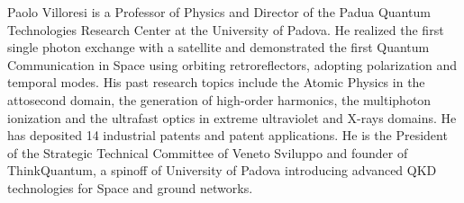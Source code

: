 \documentclass[a4paper,parskip,10pt]{scrartcl}
\begin{document}
\begin{tcolorbox}
        {
            \small
            \color{white!20!black}
            Paolo Villoresi is a Professor of Physics and Director of the Padua Quantum Technologies Research Center at the University of Padova. He realized the first single photon exchange with a satellite and demonstrated the first Quantum Communication in Space using orbiting retroreflectors, adopting polarization and temporal modes. His past research topics include the Atomic Physics in the attosecond domain, the generation of high-order harmonics, the multiphoton ionization and the ultrafast optics in extreme ultraviolet and X-rays domains. He has deposited 14 industrial patents and patent applications. He is the President of the Strategic Technical Committee of Veneto Sviluppo and founder of ThinkQuantum, a spinoff of University of Padova introducing advanced QKD technologies for Space and ground networks.}

        \vspace{2ex}
    \end{tcolorbox}

    \vfill
\end{document}
